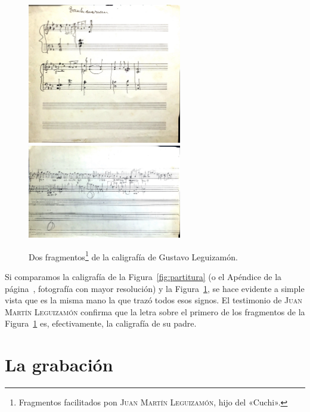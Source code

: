 \begin{figure}[H]
\begin{minipage}{\textwidth}
\centering
\includegraphics[width=0.6\textwidth]{img/manuscrito1}\\
\includegraphics[width=0.6\textwidth]{img/manuscrito2}
\caption[Dos fragmentos de la caligrafía de Gustavo Leguizamón.]{Dos fragmentos\footnote{Fragmentos facilitados pon \textsc{Juan Martín Leguizamón}, hijo del «Cuchi».} de la caligrafía de Gustavo Leguizamón.}
\label{fig:manuscritos}
\end{minipage}
\end{figure}

Si comparamos la caligrafía de la Figura~\ref{fig:partitura} (o el Apéndice de la página~\pageref{apx:partitura}, fotografía con mayor resolución) y la Figura~\ref{fig:manuscritos}, se hace evidente a simple vista que es la misma mano la que trazó todos esos signos. El testimonio de \textsc{Juan Martín Leguizamón} confirma que la letra sobre el primero de los fragmentos de la Figura~\ref{fig:manuscritos} es, efectivamente, la caligrafía de su padre.


\section{La grabación}
\label{sec:grabacion}

